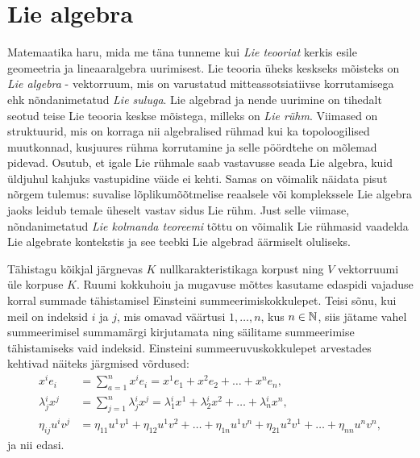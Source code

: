 

\section{Lie algebra}

Matemaatika haru, mida me täna tunneme kui \emph{Lie teooriat} kerkis esile
geomeetria ja lineaaralgebra uurimisest. Lie teooria üheks keskseks mõisteks
on \emph{Lie algebra} - vektorruum, mis on varustatud
mitteassotsiatiivse korrutamisega ehk nõndanimetatud \emph{Lie suluga}.
Lie algebrad ja nende uurimine on tihedalt seotud teise Lie teooria keskse
mõistega, milleks on \emph{Lie rühm}. Viimased on
struktuurid, mis on korraga nii algebralised rühmad kui ka topoloogilised
muutkonnad, kusjuures rühma korrutamine ja selle pöördtehe on mõlemad
pidevad. Osutub, et igale Lie rühmale saab vastavusse seada Lie algebra, kuid
üldjuhul kahjuks vastupidine väide ei kehti. Samas on võimalik näidata
pisut nõrgem tulemus: suvalise lõplikumõõtmelise
reaalsele või komplekssele Lie algebra jaoks leidub temale üheselt
vastav sidus Lie rühm.\cite{kirillov2008introduction} Just selle viimase,
nõndanimetatud \emph{Lie kolmanda teoreemi} tõttu on võimalik
Lie rühmasid vaadelda Lie algebrate kontekstis ja see teebki Lie algebrad
äärmiselt oluliseks.

Tähistagu kõikjal järgnevas $K$ nullkarakteristikaga korpust ning $V$
vektorruumi üle korpuse $K$. Ruumi kokkuhoiu ja mugavuse mõttes
kasutame edaspidi vajaduse korral summade tähistamisel
Einsteini summeerimiskokkulepet. Teisi sõnu, kui meil on indeksid $i$ ja $j$,
mis omavad väärtusi $1, \dots, n$, kus $n \in \mathbb{N}$, siis jätame vahel
summeerimisel summamärgi kirjutamata ning säilitame summeerimise tähistamiseks
vaid indeksid. Einsteini summeeruvuskokkulepet arvestades kehtivad näiteks
järgmised võrdused:
\begin{align*}
    x^{i} e_{i} &= \sum_{a=1}^{n} x^{i} e_{i} = 
        x^{1} e_{1} + x^{2} e_{2} + \dots + x^{n} e_{n}, \\
    \lambda{^i_j} x^{j} &= \sum_{j=1}^{n} 
        \lambda{^i_j} x^{j} = \lambda{^i_1} x^{1} + 
        \lambda{^i_2} x^{2} + 
        \dots +\lambda{^i_n} x^{n},\\
    \eta_{ij} u^{i} v^{j} &= \eta_{11} u^{1} v^{1} + 
        \eta_{12} u^{1} v^{2} + \dots + \eta_{1n} u^{1} v^{n} + 
        \eta_{21} u^{2} v^{1} + \dots + \eta_{nn} u^{n} v^{n},
\end{align*}
ja nii edasi.

